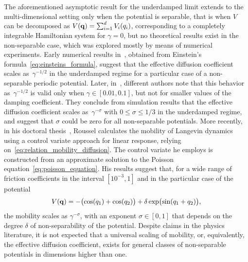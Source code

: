 \documentclass[11pt,a4paper]{article}
\begin{document}
The aforementioned asymptotic result for the underdamped limit extends to the multi-dimensional setting only when the potential is separable,
that is when $V$ can be decomposed as $V(\boldsymbol{\mathbf q}) = \sum_{i=1}^d V_i(q_i)$, corresponding to a completely integrable Hamiltonian system for $\gamma =0$, but no theoretical results exist in the non-separable case,
which was explored mostly by means of numerical experiments.
Early numerical results in~\cite{chen1996surface}, obtained from Einstein's formula~\eqref{eq:einsteins_formula},
suggest that the effective diffusion coefficient scales as~$\gamma^{-1/2}$ in the underdamped regime for a particular case of a non-separable periodic potential.
Later, in~\cite{Braun02},
different authors note that this behavior as~$\gamma^{-1/2}$ is valid only when $\gamma \in [0.01, 0.1]$,
but not for smaller values of the damping coefficient.
They conclude from simulation results that the effective diffusion coefficient scales as~$\gamma^{-\sigma}$ with $0 \leq \sigma \leq 1/3$ in the underdamped regime,
and suggest that $\sigma$ could be zero for all non-separable potentials.
More recently, in his doctoral thesis~\cite{roussel_thesis},
Roussel calculates the mobility of Langevin dynamics using a control variate approach for linear response,
relying on~\eqref{eq:relation_mobility_diffusion}.
The control variate he employs is constructed from an approximate solution to the Poisson equation~\eqref{eq:poisson_equation}.
His results suggest that, for a wide range of friction coefficients in the interval $[10^{-3}, 1]$
and in the particular case of the potential
\begin{equation}
    \label{eq:potential_julien}
    V(\boldsymbol{\mathbf q}) = - \bigl( \cos(q_1) + \cos(q_2) \bigr) + \delta \exp \bigl(\sin(q_1 + q_2)\bigr),
\end{equation}
the mobility scales as $\gamma^{- \sigma}$,
with an exponent $\sigma \in [0, 1]$ that depends on the degree $\delta$ of non-separability of the potential. Despite claims in the physics literature, it is not expected that a universal scaling of mobility, or, equivalently, the effective diffusion coefficient, exists for general classes of non-separable potentials in dimensions higher than one.
\end{document}
